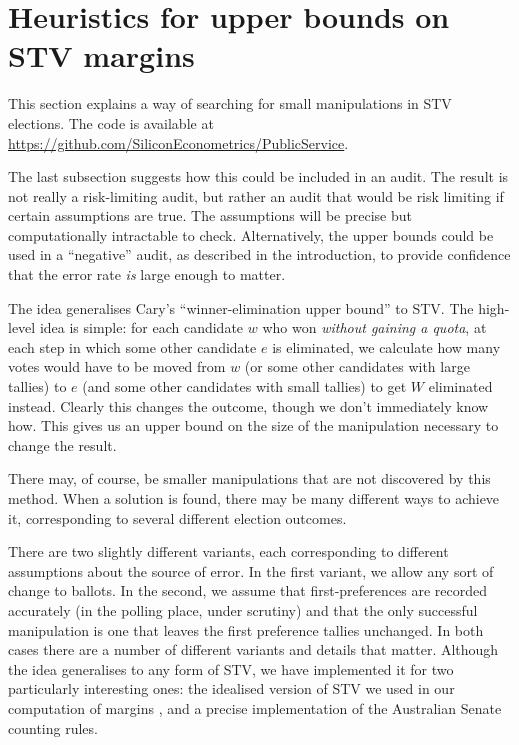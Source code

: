 \documentclass[10pt,a4paper]{article}
\newcommand{\VTNote}[1]{}
\newcommand{\longVersion}[1]{#1}
\newcommand{\longVersion}[1]{}
\begin{document}
\longVersion{
\section{Heuristics for upper bounds on STV margins}  \label{sec:winnerElimination}
\VTNote{Add a discussion on Michelle's method for finding upper bounds by looking only at the last few (20 or so) rounds.}

This section explains a way of searching for small manipulations in STV elections.  The code is available at 
\url{https://github.com/SiliconEconometrics/PublicService}.

The last subsection suggests how this could be included in an audit.  The result is not really a risk-limiting audit, but rather an audit that would be risk limiting if certain assumptions are true.  The assumptions will be precise but computationally intractable to check.   Alternatively, the upper bounds could be used in a ``negative'' audit, as described in the introduction, to provide confidence that the error rate \emph{is} large enough to matter.

The idea generalises Cary's ``winner-elimination upper bound'' to STV.  The high-level idea is simple: for each candidate $w$ who won \emph{without gaining a quota}, at each step in which some other candidate $e$ is eliminated, we calculate how many votes would have to be moved from $w$ (or some other candidates with large tallies) to $e$ (and some other candidates with small tallies) to get $W$ eliminated instead.   Clearly this changes the outcome, though we don't immediately know how.
This gives us an upper bound on the size of the manipulation necessary to change the result.  

There may, of course, be smaller manipulations that are not discovered by this method.  
When a solution is found, there may be many different ways to achieve it, corresponding to several different election outcomes.  

There are two slightly different variants, each corresponding to different assumptions about the source of error.  In the first variant, we allow any sort of change to ballots.  In the second, we assume that first-preferences are recorded accurately (in the polling place, under scrutiny) and that the only successful manipulation is one that leaves the first preference tallies unchanged.  In both cases there are a number of different variants and details that matter.  Although the idea generalises to any form of STV, we have implemented it for two particularly interesting ones: the idealised version of STV we used in our computation of margins \cite{blom2015efficient}, and a precise implementation of the Australian Senate counting rules.

}
\end{document}
